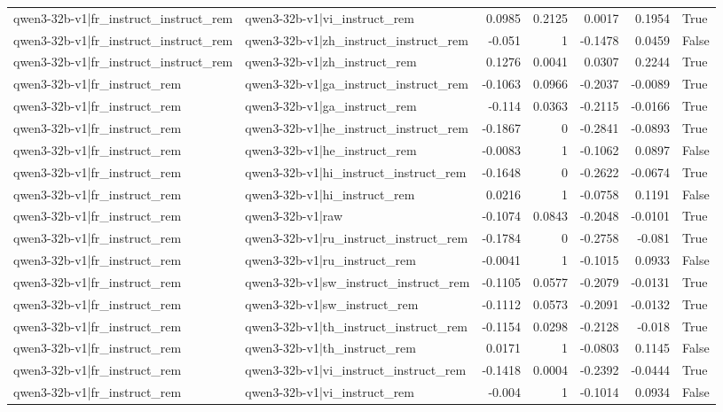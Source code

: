 \begin{table}
\begin{tabular}{l l r r r r l}
qwen3-32b-v1|fr_instruct_instruct_rem & qwen3-32b-v1|vi_instruct_rem & 0.0985 & 0.2125 & 0.0017 & 0.1954 & True \\
qwen3-32b-v1|fr_instruct_instruct_rem & qwen3-32b-v1|zh_instruct_instruct_rem & -0.051 & 1 & -0.1478 & 0.0459 & False \\
qwen3-32b-v1|fr_instruct_instruct_rem & qwen3-32b-v1|zh_instruct_rem & 0.1276 & 0.0041 & 0.0307 & 0.2244 & True \\
qwen3-32b-v1|fr_instruct_rem & qwen3-32b-v1|ga_instruct_instruct_rem & -0.1063 & 0.0966 & -0.2037 & -0.0089 & True \\
qwen3-32b-v1|fr_instruct_rem & qwen3-32b-v1|ga_instruct_rem & -0.114 & 0.0363 & -0.2115 & -0.0166 & True \\
qwen3-32b-v1|fr_instruct_rem & qwen3-32b-v1|he_instruct_instruct_rem & -0.1867 & 0 & -0.2841 & -0.0893 & True \\
qwen3-32b-v1|fr_instruct_rem & qwen3-32b-v1|he_instruct_rem & -0.0083 & 1 & -0.1062 & 0.0897 & False \\
qwen3-32b-v1|fr_instruct_rem & qwen3-32b-v1|hi_instruct_instruct_rem & -0.1648 & 0 & -0.2622 & -0.0674 & True \\
qwen3-32b-v1|fr_instruct_rem & qwen3-32b-v1|hi_instruct_rem & 0.0216 & 1 & -0.0758 & 0.1191 & False \\
qwen3-32b-v1|fr_instruct_rem & qwen3-32b-v1|raw & -0.1074 & 0.0843 & -0.2048 & -0.0101 & True \\
qwen3-32b-v1|fr_instruct_rem & qwen3-32b-v1|ru_instruct_instruct_rem & -0.1784 & 0 & -0.2758 & -0.081 & True \\
qwen3-32b-v1|fr_instruct_rem & qwen3-32b-v1|ru_instruct_rem & -0.0041 & 1 & -0.1015 & 0.0933 & False \\
qwen3-32b-v1|fr_instruct_rem & qwen3-32b-v1|sw_instruct_instruct_rem & -0.1105 & 0.0577 & -0.2079 & -0.0131 & True \\
qwen3-32b-v1|fr_instruct_rem & qwen3-32b-v1|sw_instruct_rem & -0.1112 & 0.0573 & -0.2091 & -0.0132 & True \\
qwen3-32b-v1|fr_instruct_rem & qwen3-32b-v1|th_instruct_instruct_rem & -0.1154 & 0.0298 & -0.2128 & -0.018 & True \\
qwen3-32b-v1|fr_instruct_rem & qwen3-32b-v1|th_instruct_rem & 0.0171 & 1 & -0.0803 & 0.1145 & False \\
qwen3-32b-v1|fr_instruct_rem & qwen3-32b-v1|vi_instruct_instruct_rem & -0.1418 & 0.0004 & -0.2392 & -0.0444 & True \\
qwen3-32b-v1|fr_instruct_rem & qwen3-32b-v1|vi_instruct_rem & -0.004 & 1 & -0.1014 & 0.0934 & False \\

\end{tabular}
\end{table}
